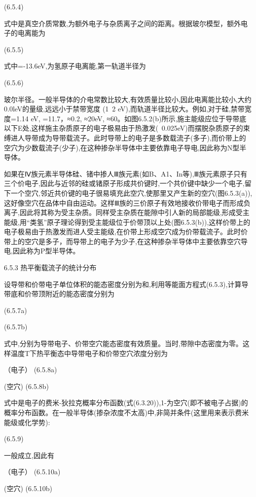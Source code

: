  	(6.5.4)

式中是真空介质常数,为额外电子与杂质离子之间的距离。根据玻尔模型，额外电子的电离能为

	(6.5.5)

式中=-13.6eV,为氢原子电离能,第一轨道半径为

 	(6.5.6)

玻尔半径。一般半导体的介电常数比较大,有效质量比较小,因此电离能比较小,大约0.0leV的量级,远远小于禁带宽度 (1~2 eV),而轨道半径比较大。例如,对于硅,禁带宽度=1.14 eV, =11.7，≈0.2, ≈20eV, ≈60。如图6.5.2(b)所示,施主能级应位于导带底以下E处,这样施主杂质原子的电子极易由于热激发(~0.025eV)而摆脱杂质原子的束缚进人导带成为导带载流子。此时导带上的电子是多数载流子(多子),而价带上的空穴为少数载流子(少子),在这种掺杂半导体中主要依靠电子导电,因此称为N型半导体。



如果在Ⅳ族元素半导体硅、锗中掺人Ⅲ族元素(如B、A1、In等),Ⅲ族元素原子只有三个价电子,因此与近邻的硅或锗原子形成共价键时,一个共价键中缺少一个电子,留下一个空穴,邻近共价键的电子很易填充此空穴,使那里又产生新的空穴(图6.5.3(a)),这好像空穴在品体中自由运动。这样Ⅲ族的三价原子有效地接收价带电子而形成负离子,因此将其称为受主杂质。同样受主杂质在能隙中引人新的局部能级,形成受主能级,用“类氢”原子理论得到受主能级位于价带顶以上处(图6.5.3(b)),这样价带上的电子极易由于热激发而进人受主能级,在价带上形成空穴成为价带载流子。此时价带上的空穴是多子，而导带上的电子为少子,在这种掺杂半导体中主要依靠空穴导电,因此称为P型半导体。



6.5.3 热平衡载流子的统计分布

设导带和价带电子单位体积的能态密度分别为和,利用等能面方程式(6.5.3),计算导带底和价带顶附近的能态密度分别为

 	(6.5.7a)

 	(6.5.7b)



式中,分别为导带电子、价带空穴能态密度有效质量。当时,带隙中态密度为零。这样温度T下热平衡态中导带电子和价带空穴浓度分别为

 （电子）	(6.5.8a)

 (空穴)	(6.5.8b)

式中是电子的费米-狄拉克概率分布函数(式(6.3.20)),1-为空穴(即不被电子占据)的概率分布函数。在一般半导体(掺杂浓度不太高)中,非简并条件(这里用来表示费米能级或化学势):

 	(6.5.9)

一般成立,因此有

 （电子）	(6.5.10a)

 (空穴) 	(6.5.10b)


